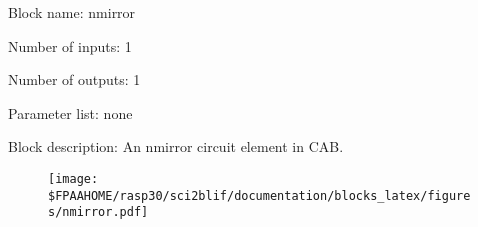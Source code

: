 \pagebreak

Block name: nmirror

Number of inputs: 1

Number of outputs: 1

Parameter list: none

Block description: 
An nmirror circuit element in CAB.

\begin{figure}[H]  %
\texttt{[image: \$FPAAHOME/rasp30/sci2blif/documentation/blocks\_latex/figures/nmirror.pdf]}
\end{figure}

